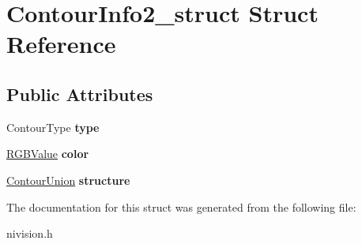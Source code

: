 \hypertarget{structContourInfo2__struct}{
\section{ContourInfo2\_\-struct Struct Reference}
\label{structContourInfo2__struct}
}
\subsection*{Public Attributes}
\begin{DoxyCompactItemize}
\item 
\hypertarget{structContourInfo2__struct_afa16a54510ab7cd85f664f19b270fe4e}{
ContourType {\bfseries type}}
\label{structContourInfo2__struct_afa16a54510ab7cd85f664f19b270fe4e}

\item 
\hypertarget{structContourInfo2__struct_a7d5a43fc540e1be2e7597579c8619b2a}{
\hyperlink{structRGBValue__struct}{RGBValue} {\bfseries color}}
\label{structContourInfo2__struct_a7d5a43fc540e1be2e7597579c8619b2a}

\item 
\hypertarget{structContourInfo2__struct_ae3ff34c089b48c836be917e1c4a94ca2}{
\hyperlink{unionContourUnion__union}{ContourUnion} {\bfseries structure}}
\label{structContourInfo2__struct_ae3ff34c089b48c836be917e1c4a94ca2}

\end{DoxyCompactItemize}


The documentation for this struct was generated from the following file:\begin{DoxyCompactItemize}
\item 
nivision.h\end{DoxyCompactItemize}

